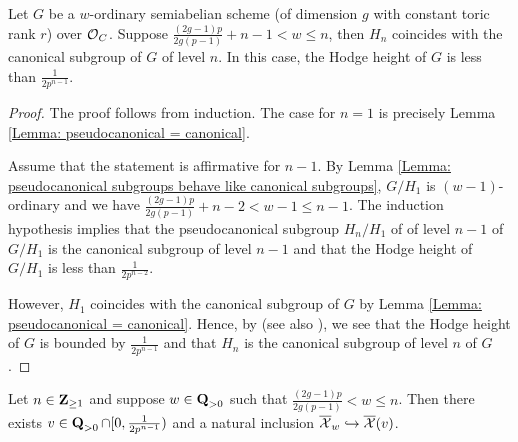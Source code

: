 \begin{Proposition}\label{Proposition: pseudocanonical = canonical}
Let $G$ be a $w$-ordinary semiabelian scheme (of dimension $g$ with constant toric rank $r$) over $\operatorname{\mathcal{O}}_C$. Suppose $\frac{(2g-1)p}{2g(p-1)}+n-1 < w \leq n$, then $H_{n}$ coincides with the canonical subgroup of $G$ of level $n$. In this case, the Hodge height of $G$ is less than $\frac{1}{2p^{n-1}}$.
\end{Proposition}
\begin{proof}
The proof follows from induction. The case for $n=1$ is precisely Lemma \ref{Lemma: pseudocanonical = canonical}. 

Assume that the statement is affirmative for $n-1$. By Lemma \ref{Lemma: pseudocanonical subgroups behave like canonical subgroups}, $G/H_1$ is $(w-1)$-ordinary and we have $\frac{(2g-1)p}{2g(p-1)}+n-2 < w-1 \leq n-1$. The induction hypothesis implies that the pseudocanonical subgroup $H_{n}/H_1$ of of level $n-1$ of $G/H_1$ is the canonical subgroup of level $n-1$ and that the Hodge height of $G/H_1$ is less than $\frac{1}{2p^{n-2}}$.

However, $H_1$ coincides with the canonical subgroup of $G$ by Lemma \ref{Lemma: pseudocanonical = canonical}. Hence, by \cite[Th\'eor\`em 6 (4)]{Fargues-canonical} (see also \cite[Theorem 3.1.1 (5)]{AIP-2015}), we see that the Hodge height of $G$ is bounded by $\frac{1}{2p^{n-1}}$ and that $H_n$ is the canonical subgroup of level $n$ of $G$.
\end{proof}

\begin{Corollary}\label{Corollary: w-locus injects into v-locus}
Let $n\in \operatorname{\mathbf{Z}}_{\geq 1}$ and suppose $w\in \operatorname{\mathbf{Q}}_{>0}$ such that $\frac{(2g-1)p}{2g(p-1)}<w\leq n$. Then there exists $v\in \operatorname{\mathbf{Q}}_{>0}\cap [0, \frac{1}{2p^{n-1}})$ and a natural inclusion $\overline{\operatorname{\mathcal{X}}}_w\hookrightarrow \overline{\operatorname{\mathcal{X}}}(v)$.
\end{Corollary}

